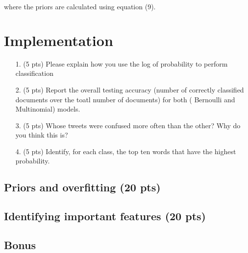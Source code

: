 \documentclass{article}
\begin{document}
\noindent
where the priors are calculated using equation (9).

\section{Implementation}

\begin{enumerate}

\item [1.] (5 pts) Please explain how you use the log of probability to perform classification

\item [2.] (5 pts) Report the overall testing accuracy (number of correctly classified documents over the toatl number of documents) for both ( Bernoulli and Multinomial) models.

\item [3.] (5 pts) Whose tweets were confused more often than the other? Why do you think this is?

\item [4.] (5 pts) Identify, for each class, the top ten words that have the highest probability.

\end{enumerate}

\subsection{Priors and overfitting (20 pts)}

\subsection{Identifying important features (20 pts)}

\subsection{Bonus}
\end{document}
